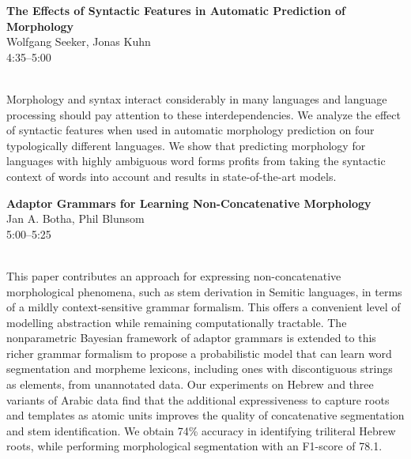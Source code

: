 \documentclass[twoside,makeidx]{book}
\begin{document}
\par\vspace{2em}\noindent%
\begin{minipage}{\linewidth}%
\begin{center}
\textbf{\normalsize The Effects of Syntactic Features in Automatic Prediction of Morphology}\\
\normalsize  Wolfgang Seeker,  Jonas Kuhn\\
{\small 4:35--5:00}\\
\end{center}
\end{minipage}\\[0.5em]
\nopagebreak%
\noindent%
{\small Morphology and syntax interact considerably in many languages and language processing should pay attention to these interdependencies. We analyze the effect of syntactic features when used in automatic morphology prediction on four  typologically different languages. We show that predicting morphology for languages with highly ambiguous word forms profits from taking the syntactic context of words into account and results in state-of-the-art models.}
\par\vspace{2em}\noindent%
\begin{minipage}{\linewidth}%
\begin{center}
\textbf{\normalsize Adaptor Grammars for Learning Non-Concatenative Morphology}\\
\normalsize  Jan A. Botha,  Phil Blunsom\\
{\small 5:00--5:25}\\
\end{center}
\end{minipage}\\[0.5em]
\nopagebreak%
\noindent%
{\small This paper contributes an approach for expressing non-concatenative morphological phenomena, such as stem derivation in Semitic languages, in terms of a mildly context-sensitive grammar formalism. This offers a convenient level of modelling abstraction while remaining computationally tractable. The nonparametric Bayesian framework of adaptor grammars is extended to this richer grammar formalism to propose a probabilistic model that can learn word segmentation and morpheme lexicons, including ones with discontiguous strings as elements, from unannotated data. Our experiments on Hebrew and three variants of Arabic data find that the additional expressiveness to capture roots and templates as atomic units improves the quality of concatenative segmentation and stem identification. We obtain 74\% accuracy in identifying triliteral Hebrew roots, while performing morphological segmentation with an F1-score of 78.1.}
\clearpage
\end{document}
